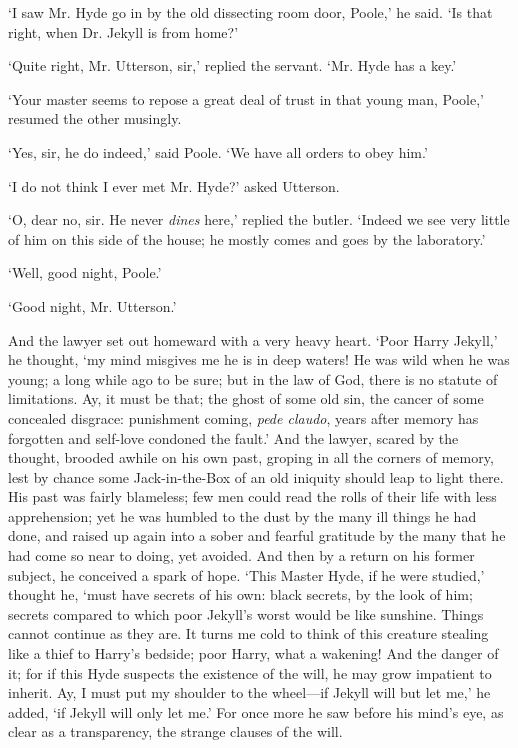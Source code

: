 \documentclass[]{novel}
\begin{document}
‘I saw Mr. Hyde go in by the old dissecting room door, Poole,’ he said. ‘Is that right, when Dr. Jekyll is from home?’

‘Quite right, Mr. Utterson, sir,’ replied the servant. ‘Mr. Hyde has a key.’

‘Your master seems to repose a great deal of trust in that young man, Poole,’ resumed the other musingly.

‘Yes, sir, he do indeed,’ said Poole. ‘We have all orders to obey him.’

‘I do not think I ever met Mr. Hyde?’ asked Utterson.

‘O, dear no, sir. He never \emph{dines} here,’ replied the butler. ‘Indeed we see very little of him on this side of the house; he mostly comes and goes by the laboratory.’

‘Well, good night, Poole.’

‘Good night, Mr. Utterson.’

And the lawyer set out homeward with a very heavy heart. ‘Poor Harry Jekyll,’ he thought, ‘my mind misgives me he is in deep waters! He was wild when he was young; a long while ago to be sure; but in the law of God, there is no statute of limitations. Ay, it must be that; the ghost of some old sin, the cancer of some concealed disgrace: punishment coming, \emph{pede claudo}, years after memory has forgotten and self-love condoned the fault.’ And the lawyer, scared by the thought, brooded awhile on his own past, groping in all the corners of memory, lest by chance some Jack-in-the-Box of an old iniquity should leap to light there. His past was fairly blameless; few men could read the rolls of their life with less apprehension; yet he was humbled to the dust by the many ill things he had done, and raised up again into a sober and fearful gratitude by the many that he had come so near to doing, yet avoided. And then by a return on his former subject, he conceived a spark of hope. ‘This Master Hyde, if he were studied,’ thought he, ‘must have secrets of his own: black secrets, by the look of him; secrets compared to which poor Jekyll’s worst would be like sunshine. Things cannot continue as they are. It turns me cold to think of this creature stealing like a thief to Harry’s bedside; poor Harry, what a wakening! And the danger of it; for if this Hyde suspects the existence of the will, he may grow impatient to inherit. Ay, I must put my shoulder to the wheel—if Jekyll will but let me,’ he added, ‘if Jekyll will only let me.’ For once more he saw before his mind’s eye, as clear as a transparency, the strange clauses of the will.
\end{document}
